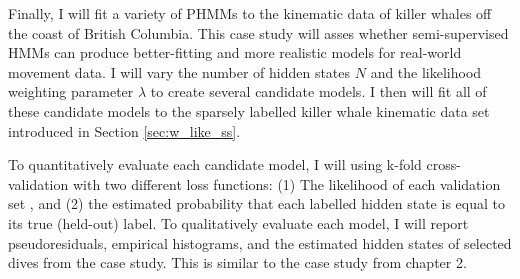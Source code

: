 
Finally, I will fit a variety of PHMMs to the kinematic data of killer whales off the coast of British Columbia. This case study will asses whether semi-supervised HMMs can produce better-fitting and more realistic models for real-world movement data. I will vary the number of hidden states $N$ and the likelihood weighting parameter $\lambda$ to create several candidate models. I then will fit all of these candidate models to the sparsely labelled killer whale kinematic data set introduced in Section \ref{sec:w_like_ss}. 

To quantitatively evaluate each candidate model, I will using k-fold cross-validation with two different loss functions: (1) The likelihood of each validation set \citep{Celeux:2008}, and (2) the estimated probability that each labelled hidden state is equal to its true (held-out) label. To qualitatively evaluate each model, I will report pseudoresiduals, empirical histograms, and the estimated hidden states of selected dives from the case study. This is similar to the case study from chapter 2. %



\iffalse
a PHMM as defined above and fit both a regular PHMM as well as a PHMM that explicitly models the probability of observing a label. Then, I will comparing the resulting models to determine the effect of assuming that $p^{(i)}(y^o_t)$ is a constant. While the precise simulation study setup is subject to change, I will beginning with the following setup:

\begin{enumerate}
    \item Simulate 500 data sets from a PHMM with Normal emissions and $p^{(i)}$
\end{enumerate}

Then, I will compare the errors of the estimated probability distributions, the transition matrices, and the standard errors. One metric is the proportion of hidden states in the simulation study which are correctly estimated as a function of the number of labels observed. Another is the Wasserstein distance between a given model and the generating model in a simulation study. The relationship between HMM accuracy and the number of labelled examples may change depending upon the number of possible hidden states (N) the number of observations (T), the structure of the PHMM, etc.

\subsection{weighted likelihood}

I will 

\fi